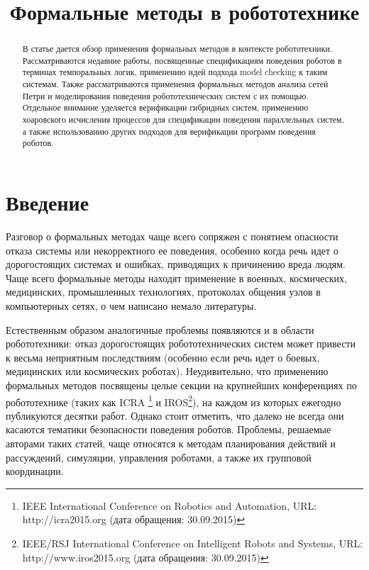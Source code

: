 \documentclass[conference]{IEEEtran}
\begin{document}
\title{Формальные методы в робототехнике}

\author{
\and
}

\maketitle

\begin{abstract}
В статье дается обзор применения формальных методов в контексте робототехники. 
Рассматриваются недавние работы, посвященные спецификациям поведения роботов в 
терминах темпоральных логик, применению идей подхода model checking к таким системам. 
Также рассматриваются применения формальных методов анализа сетей Петри и 
моделирования поведения робототехнических систем с их помощью. Отдельное внимание 
уделяется верификации гибридных систем, применению хоаровского исчисления процессов 
для спецификации поведения параллельных систем, а также использованию других 
подходов для верификации программ поведения роботов.
\end{abstract}

\section{Введение}
Разговор о формальных методах чаще всего сопряжен с понятием опасности отказа 
системы или некорректного ее поведения, особенно когда речь идет о дорогостоящих 
системах и ошибках, приводящих к причинению вреда людям. Чаще всего формальные 
методы находят применение в военных, космических, медицинских, промышленных 
технологиях, протоколах общения узлов в компьютерных сетях, о чем написано немало 
литературы. 

Естественным образом аналогичные проблемы появляются и в области робототехники: 
отказ дорогостоящих робототехнических систем может привести к весьма неприятным 
последствиям (особенно если речь идет о боевых, медицинских или космических 
роботах). Неудивительно, что применению формальных методов посвящены целые 
секции на крупнейших конференциях по робототехнике (таких как ICRA%
\footnote{IEEE International Conference on Robotics and Automation, URL: http://icra2015.org (дата обращения: 30.09.2015)}
и IROS\footnote{IEEE/RSJ International Conference on Intelligent Robots and Systems, URL: http://www.iros2015.org (дата обращения: 30.09.2015)}), 
на каждом из которых ежегодно публикуются десятки работ. Однако стоит отметить, 
что далеко не всегда они касаются тематики безопасности поведения роботов. 
Проблемы, решаемые авторами таких статей, чаще относятся к методам планирования 
действий и рассуждений, симуляции, управления роботами, а также их групповой 
координации.
\end{document}

